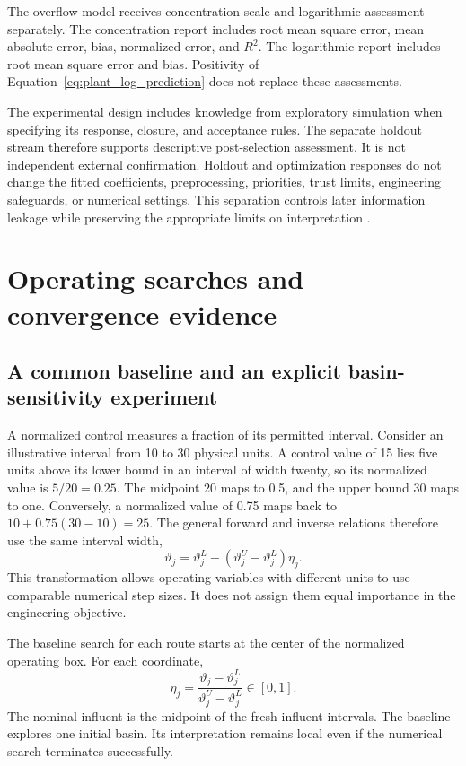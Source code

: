 The overflow model receives concentration-scale and logarithmic assessment separately. The concentration report includes root mean square error, mean absolute error, bias, normalized error, and $R^2$. The logarithmic report includes root mean square error and bias. Positivity of Equation~\eqref{eq:plant_log_prediction} does not replace these assessments.

The experimental design includes knowledge from exploratory simulation when specifying its response, closure, and acceptance rules. The separate holdout stream therefore supports descriptive post-selection assessment. It is not independent external confirmation. Holdout and optimization responses do not change the fitted coefficients, preprocessing, priorities, trust limits, engineering safeguards, or numerical settings. This separation controls later information leakage while preserving the appropriate limits on interpretation \citep{Kaufman2012}.

\section{Operating searches and convergence evidence}

\subsection{A common baseline and an explicit basin-sensitivity experiment}

A normalized control measures a fraction of its permitted interval. Consider an illustrative interval from 10 to 30 physical units. A control value of 15 lies five units above its lower bound in an interval of width twenty, so its normalized value is $5/20=0.25$. The midpoint 20 maps to 0.5, and the upper bound 30 maps to one. Conversely, a normalized value of 0.75 maps back to $10+0.75(30-10)=25$. The general forward and inverse relations therefore use the same interval width,
\[
\vartheta_j=\vartheta_j^L+(\vartheta_j^U-\vartheta_j^L)\eta_j.
\]
This transformation allows operating variables with different units to use comparable numerical step sizes. It does not assign them equal importance in the engineering objective.

The baseline search for each route starts at the center of the normalized operating box. For each coordinate,
\begin{equation}
\eta_j=\frac{\vartheta_j-\vartheta_j^L}{\vartheta_j^U-\vartheta_j^L}\in[0,1].
\label{eq:plant_normalized_controls}
\end{equation}
The nominal influent is the midpoint of the fresh-influent intervals. The baseline explores one initial basin. Its interpretation remains local even if the numerical search terminates successfully.


